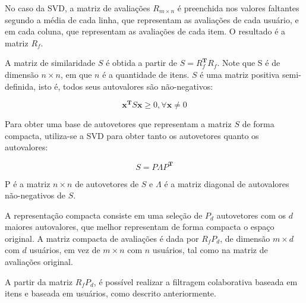 No caso da SVD, a matriz de avaliações $R_{m \times n}$ é preenchida nos valores faltantes
segundo a média de cada linha, que representam as avaliações de cada usuário, e
em cada coluna, que representam as avaliações de cada item. O resultado é a
matriz $R_f$.

A matriz de similaridade $S$ é obtida a partir de $S = R_f^{\mathbf{T} }R_f$.
Note que S é de dimensão $n \times n$, em que $n$ é a quantidade de itens. $S$ é
uma matriz positiva semi-definida, isto é, todos seus autovalores são
não-negativos:

\begin{equation}
    \mathbf{x}^{\mathbf{T}} S \mathbf{x} \geq 0, \forall \mathbf{x} \neq 0
\end{equation}

 Para obter uma base de autovetores que representam a matriz $S$ de forma
 compacta, utiliza-se a SVD para obter tanto os autovetores quanto os autovalores:

\begin{equation}
    S = P \Lambda P^{\mathbf{T}}
\end{equation}

P é a matriz $n \times n$ de autovetores de $S$ e $\Lambda$ é a matriz diagonal
de autovalores não-negativos de $S$.

A representação compacta consiste em uma seleção de $P_d$ autovetores com os $d$
maiores autovalores, que melhor representam de forma compacta o espaço original.
A matriz compacta de avaliações é dada por $R_{f}P_{d}$, de dimensão $m \times
d$ com $d$ usuários, em vez de $m \times n$ com $n$ usuários, tal como na matriz
de avaliações original.

A partir da matriz $R_{f}P_{d}$, é possível realizar a filtragem colaborativa
baseada em itens e baseada em usuários, como descrito anteriormente.


